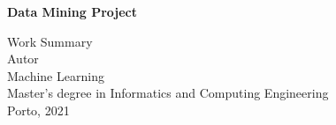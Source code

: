 \documentclass[a4paper,12pt]{report}
\begin{document}
	\begin{titlepage}
		
		\begin{center}
		
		
		
		\vspace{3cm}
		\huge
		\textbf{Data Mining Project}
		
		\Large
		Work Summary\\
		
		
		\vspace{2.5cm}
		\large
		Autor\\

		
		\vspace{3cm}
		Machine Learning\\
		Master's degree in Informatics and Computing Engineering \\
		
		\vspace{2cm}		
		Porto, 2021
		
		\end{center}
	\end{titlepage}	
	
	
	
	\newpage
	\tableofcontents
	
	\newpage	
	



	
\end{document}
